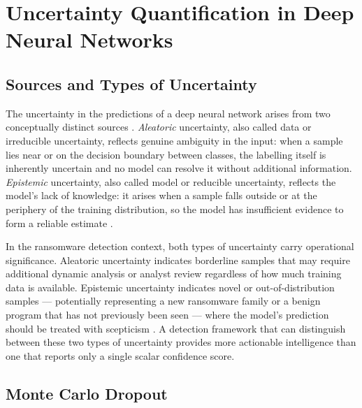\section{Uncertainty Quantification in Deep Neural Networks}
\label{sec:lit_uq}

\subsection{Sources and Types of Uncertainty}
\label{sec:lit_uq_types}

The uncertainty in the predictions of a deep neural network arises from two conceptually
distinct sources \cite{gawlikowski2023Uncertainity, malinin2018predictive}.
\emph{Aleatoric} uncertainty, also called data or irreducible uncertainty, reflects genuine
ambiguity in the input: when a sample lies near or on the decision boundary between classes,
the labelling itself is inherently uncertain and no model can resolve it without additional
information.
\emph{Epistemic} uncertainty, also called model or reducible uncertainty, reflects the
model's lack of knowledge: it arises when a sample falls outside or at the periphery of the
training distribution, so the model has insufficient evidence to form a reliable
estimate \cite{gawlikowski2023Uncertainity}.

In the ransomware detection context, both types of uncertainty carry operational significance.
Aleatoric uncertainty indicates borderline samples that may require additional dynamic
analysis or analyst review regardless of how much training data is available.
Epistemic uncertainty indicates novel or out-of-distribution samples — potentially
representing a new ransomware family or a benign program that has not previously been
seen — where the model's prediction should be treated with
scepticism \cite{Doan2024uncertainBay}.
A detection framework that can distinguish between these two types of uncertainty provides
more actionable intelligence than one that reports only a single scalar confidence score.

\subsection{Monte Carlo Dropout}
\label{sec:lit_mcd}

